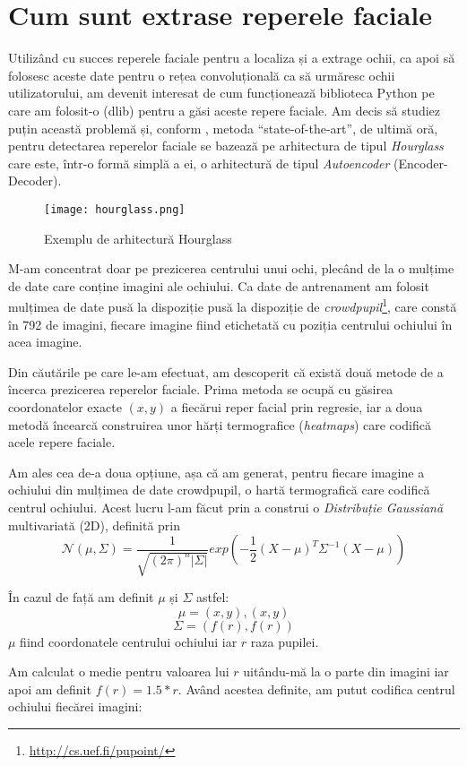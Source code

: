 \chapter{Cum sunt extrase reperele faciale}
\label{chapter6}
Utilizând cu succes reperele faciale pentru a localiza și a extrage ochii, ca apoi să folosesc aceste date pentru o rețea convoluțională ca să urmăresc ochii utilizatorului, am devenit interesat de cum funcționează biblioteca Python pe care am folosit-o (dlib) pentru a găsi aceste repere faciale.
Am decis să studiez puțin această problemă și, conform \cite{paper_stacked_hourglass}, metoda ``state-of-the-art'', de ultimă oră, pentru detectarea reperelor faciale se bazează pe arhitectura de tipul \emph{Hourglass} care este, într-o formă simplă a ei, o arhitectură de tipul \emph{Autoencoder} (Encoder-Decoder).

\begin{figure}[h]
    \centering
    \texttt{[image: hourglass.png]}
    \caption{Exemplu de arhitectură Hourglass}
\end{figure}

M-am concentrat doar pe prezicerea centrului unui ochi, plecând de la o mulțime de date care conține imagini ale ochiului.
Ca date de antrenament am folosit mulțimea de date pusă la dispoziție pusă la dispoziție de \emph{crowdpupil}\footnote{\url{http://cs.uef.fi/pupoint/}}, care constă în 792 de imagini, fiecare imagine fiind etichetată cu poziția centrului ochiului în acea imagine.

Din căutările pe care le-am efectuat, am descoperit că există două metode de a încerca prezicerea reperelor faciale.
Prima metoda se ocupă cu găsirea coordonatelor exacte $(x, y)$ a fiecărui reper facial prin regresie, iar a doua metodă încearcă construirea unor hărți termografice (\emph{heatmaps}) care codifică acele repere faciale.

Am ales cea de-a doua opțiune, așa că am generat, pentru fiecare imagine a ochiului din mulțimea de date crowdpupil, o hartă termografică care codifică centrul ochiului.
Acest lucru l-am făcut prin a construi o \emph{Distribuție Gaussiană} multivariată (2D), definită prin
$$\mathcal{N}(\mu, \Sigma) = \frac{1}{\sqrt{(2\pi)^{n}|\Sigma|}}exp(-\frac{1}{2}(X-\mu)^T\Sigma^{-1}(X-\mu))$$

În cazul de față am definit $\mu$ și $\Sigma$ astfel:
$$\mu = (x, y), (x, y)$$
$$\Sigma = (f(r), f(r))$$
$\mu$ fiind coordonatele centrului ochiului iar $r$ raza pupilei.

Am calculat o medie pentru valoarea lui $r$ uitându-mă la o parte din imagini iar apoi am definit $f(r) = 1.5 * r$.
Având acestea definite, am putut codifica centrul ochiului fiecărei imagini:


